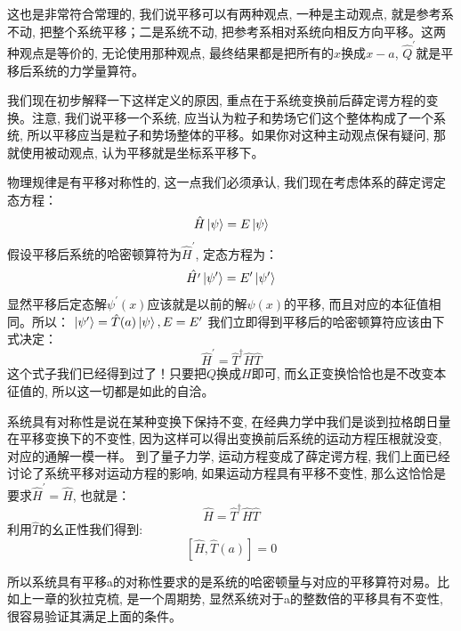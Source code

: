 \documentclass[a4paper,zihao=-4,linespread=1]{ctexrep}
\begin{document}
    这也是非常符合常理的, 我们说平移可以有两种观点, 一种是主动观点, 就是参考系不动, 把整个系统平移；二是系统不动, 把参考系相对系统向相反方向平移。这两种观点是等价的,
    无论使用那种观点, 最终结果都是把所有的$x$换成$x-a$, $\hat{Q}^\prime$就是平移后系统的力学量算符。

    我们现在初步解释一下这样定义的原因, 重点在于系统变换前后薛定谔方程的变换。注意, 我们说平移一个系统, 应当认为粒子和势场它们这个整体构成了一个系统, 所以平移应当是粒子和势场整体的平移。如果你对这种主动观点保有疑问, 那就使用被动观点,
    认为平移就是坐标系平移下。

    物理规律是有平移对称性的, 这一点我们必须承认, 我们现在考虑体系的薛定谔定态方程：
    \begin{equation}
        \hat{H}\ket{\psi}=E\ket{\psi}
    \end{equation}
    假设平移后系统的哈密顿算符为$\hat{H}^\prime$, 定态方程为：
    \begin{equation}
        \hat{H^\prime}\ket{\psi^\prime}=E^\prime\ket{\psi^\prime} 
    \end{equation}
    显然平移后定态解$\psi^\prime(x)$应该就是以前的解$\psi(x)$的平移, 而且对应的本征值相同。所以：
    $\ket{\psi^\prime}=\hat{T}(a)\ket{\psi},E=E^\prime$
    我们立即得到平移后的哈密顿算符应该由下式决定：
    $$\hat{H}^\prime=\hat{T}^\dagger\hat{H}\hat{T}$$
    这个式子我们已经得到过了！只要把$Q$换成$H$即可, 而幺正变换恰恰也是不改变本征值的, 所以这一切都是如此的自洽。
    
    系统具有对称性是说在某种变换下保持不变, 在经典力学中我们是谈到拉格朗日量在平移变换下的不变性, 因为这样可以得出变换前后系统的运动方程压根就没变, 对应的通解一模一样。
    到了量子力学, 运动方程变成了薛定谔方程, 我们上面已经讨论了系统平移对运动方程的影响, 如果运动方程具有平移不变性, 那么这恰恰是要求$\hat{H}^\prime=\hat{H}$, 也就是：
    \begin{equation}
        \hat{H}=\hat{T}^\dagger\hat{H}\hat{T}
    \end{equation}
    利用$\hat{T}$的幺正性我们得到:
    \begin{equation}
        \boxed{\left[\hat{H},\hat{T}(a)\right]=0}
    \end{equation}
    
    所以系统具有平移a的对称性要求的是系统的哈密顿量与对应的平移算符对易。比如上一章的狄拉克梳, 是一个周期势, 显然系统对于a的整数倍的平移具有不变性, 很容易验证其满足上面的条件。
    
\end{document}
